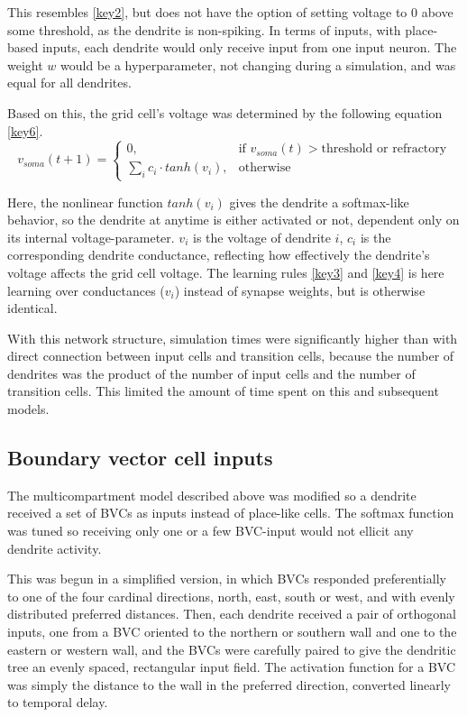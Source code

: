 \documentclass{article}
\begin{document}
    This resembles \ref{key2}, but does not have the option of setting voltage to 0 above some threshold, as the dendrite is non-spiking. In terms of inputs, with place-based inputs, each dendrite would only receive input from one input neuron. The weight \(w\) would be a hyperparameter, not changing during a simulation, and was equal for all dendrites.
    
    Based on this, the grid cell's voltage was determined by the following equation \ref{key6}. 
        \begin{equation}\label{key6} v_{soma}(t + 1) = \begin{cases} 0, & \text{if } v_{soma}(t) > \text{threshold or refractory}\\
        \sum_{i}^{} c_i \cdot tanh(v_i), & \text{otherwise} \end{cases}\end{equation} 
        
    Here, the nonlinear function \(tanh(v_i)\) gives the dendrite a softmax-like behavior, so the dendrite at anytime is either activated or not, dependent only on its internal voltage-parameter. \(v_i\) is the voltage of dendrite \(i\), \(c_i\) is the corresponding dendrite conductance, reflecting how effectively the dendrite's voltage affects the grid cell voltage. The learning rules \ref*{key3} and \ref*{key4} is here learning over conductances (\(v_i\)) instead of synapse weights, but is otherwise identical.

    With this network structure, simulation times were significantly higher than with direct connection between input cells and transition cells, because the number of dendrites was the product of the number of input cells and the number of transition cells. This limited the amount of time spent on this and subsequent models.

    \subsection{Boundary vector cell inputs} \label{BVC Model}
    The multicompartment model described above was modified so a dendrite received a set of BVCs as inputs instead of place-like cells. The softmax function was tuned so receiving only one or a few BVC-input would not ellicit any dendrite activity.

    This was begun in a simplified version, in which BVCs responded preferentially to one of the four cardinal directions, north, east, south or west, and with evenly distributed preferred distances. Then, each dendrite received a pair of orthogonal inputs, one from a BVC oriented to the northern or southern wall and one to the eastern or western wall, and the BVCs were carefully paired to give the dendritic tree an evenly spaced, rectangular input field. The activation function for a BVC was simply the distance to the wall in the preferred direction, converted linearly to temporal delay.
        
\end{document}
